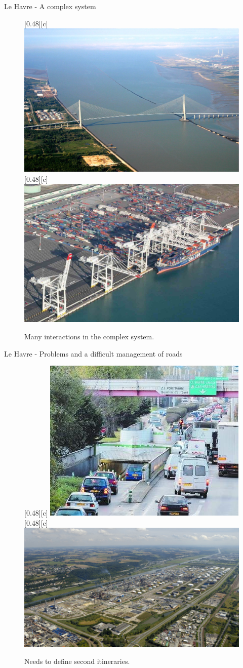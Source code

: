 \documentclass{beamer}
\begin{document}
\begin{frame}{Le Havre - A complex system}
	\begin{figure}[htbp]
		\centering
		[0.48\linewidth][c]{
			\includegraphics[width=0.48\linewidth]{./img/le_havre_system_complex_environnement.jpg}
		}
		[0.48\linewidth][c]{
			\includegraphics[width=0.48\linewidth]{./img/le_havre_system_complex_port.jpg}
		}
		\caption{Many interactions in the complex system.}
		\label{fig:complex_systems_2}
	\end{figure}
\end{frame}

\begin{frame}{Le Havre - Problems and a difficult management of roads}
	\begin{figure}[htbp]
		\centering
		[0.48\linewidth][c]{
			\includegraphics[width=0.48\linewidth]{./img/le_havre_problem_transport.jpg}
		}
		[0.48\linewidth][c]{
			\includegraphics[width=0.48\linewidth]{./img/le_havre_problem_industries.jpg}
		}
		\caption{Needs to define second itineraries.}
		\label{fig:problem_and_difficulties}
	\end{figure}
\end{frame}
\end{document}

